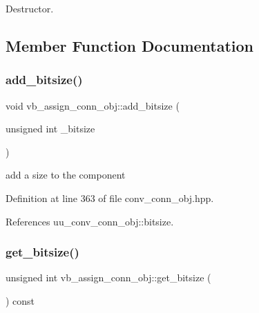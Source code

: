 Destructor. 



\subsection{Member Function Documentation}
\mbox{\label{classvb__assign__conn__obj_a9cc96e0d0b73a063cb691aa79ad46c9c}} 
\subsubsection{\texorpdfstring{add\+\_\+bitsize()}{add\_bitsize()}}
{\footnotesize\ttfamily void vb\+\_\+assign\+\_\+conn\+\_\+obj\+::add\+\_\+bitsize (\begin{DoxyParamCaption}\item[{unsigned int}]{\+\_\+bitsize }\end{DoxyParamCaption})\hspace{0.3cm}{\ttfamily [inline]}}



add a size to the component 



Definition at line 363 of file conv\+\_\+conn\+\_\+obj.\+hpp.



References uu\+\_\+conv\+\_\+conn\+\_\+obj\+::bitsize.

\mbox{\label{classvb__assign__conn__obj_af101b9819086ff6b3ce4979d3e28aa3e}} 
\subsubsection{\texorpdfstring{get\+\_\+bitsize()}{get\_bitsize()}}
{\footnotesize\ttfamily unsigned int vb\+\_\+assign\+\_\+conn\+\_\+obj\+::get\+\_\+bitsize (\begin{DoxyParamCaption}{ }\end{DoxyParamCaption}) const\hspace{0.3cm}{\ttfamily [inline]}}



